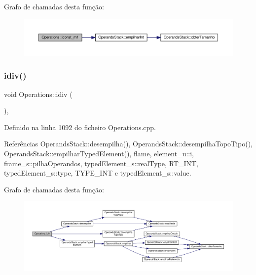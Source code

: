 Grafo de chamadas desta função\+:
\nopagebreak
\begin{figure}[H]
\begin{center}
\leavevmode
\includegraphics[width=350pt]{classOperations_abb57552d42047d4b685b2d68db6b1fd7_cgraph}
\end{center}
\end{figure}
\mbox{\label{classOperations_a5bf24c3cc02a8282c21a37cd7b7ba5d3}} 
\subsubsection{\texorpdfstring{idiv()}{idiv()}}
{\footnotesize\ttfamily void Operations\+::idiv (\begin{DoxyParamCaption}{ }\end{DoxyParamCaption})\hspace{0.3cm}{\ttfamily [static]}, {\ttfamily [private]}}



Definido na linha 1092 do ficheiro Operations.\+cpp.



Referências Operands\+Stack\+::desempilha(), Operands\+Stack\+::desempilha\+Topo\+Tipo(), Operands\+Stack\+::empilhar\+Typed\+Element(), flame, element\+\_\+u\+::i, frame\+\_\+s\+::pilha\+Operandos, typed\+Element\+\_\+s\+::real\+Type, R\+T\+\_\+\+I\+NT, typed\+Element\+\_\+s\+::type, T\+Y\+P\+E\+\_\+\+I\+NT e typed\+Element\+\_\+s\+::value.

Grafo de chamadas desta função\+:
\nopagebreak
\begin{figure}[H]
\begin{center}
\leavevmode
\includegraphics[width=350pt]{classOperations_a5bf24c3cc02a8282c21a37cd7b7ba5d3_cgraph}
\end{center}
\end{figure}
\mbox{\label{classOperations_aa0432645b0d0effb4d4d839ea2dcec1c}} 
